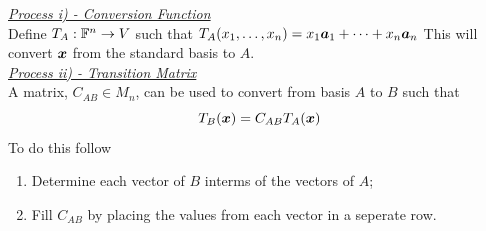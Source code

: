 \documentclass[11pt,a4paper]{article}
\begin{document}
\underline{\textit{Process  i) - Conversion Function}}\\
  Define $T_A : \mathbb{F}^n \to V$ such that $T_A(x_1, \dots , x_n) = x_1\boldsymbol{a}_1 + \dots + x_n\boldsymbol{a}_n$
This will convert $\boldsymbol{x}$ from the standard basis to $A$.\\

\underline{\textit{Process ii) - Transition Matrix}}\\
  A matrix, $C_{AB} \in M_n$, can be used to convert from basis $A$ to $B$ such that
$$T_B(\boldsymbol{x}) = C_{AB}T_A(\boldsymbol{x})$$
To do this follow
\begin{enumerate}[label=\roman*)]
  \itemsep0em
  \item Determine each vector of $B$ interms of the vectors of $A$;
  \item Fill $C_{AB}$ by placing the values from each vector in a seperate row.
\end{enumerate}
\end{document}
